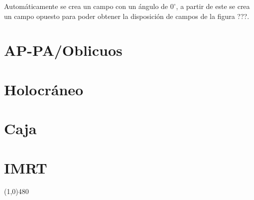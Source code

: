 \documentclass{article}
\begin{document}
Automáticamente se crea un campo con un ángulo de $0^{\circ}$, a partir de este se crea un campo opuesto para poder obtener la disposición de campos de la figura ???.



\vspace{3pt}

\section*{AP-PA/Oblicuos}

\vspace{3pt}

\section*{Holocráneo}

\vspace{3pt}

\section*{Caja}

\vspace{3pt}


\section*{IMRT}
    
\vspace{3pt}


\begin{center}
\line(1,0){480}
\end{center}
\end{document}
